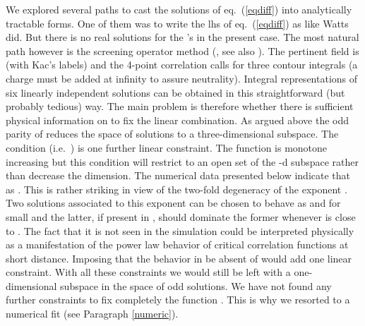 \documentclass[a4paper,12pt]{article}
\begin{document}
We explored several
paths to cast the solutions of eq.\ (\ref{eqdiff}) into analytically tractable forms.
One of them was to write the lhs of eq.\ (\ref{eqdiff}) as 
\coordHE{} like Watts did.
But there is no real solutions for the \coordHE{}'s in the present case. The most
natural path however is the screening operator method (\cite{DF}, see also
\cite{dFMS}). The pertinent field is \coordHE{} (with Kac's labels)
and the 4-point correlation calls for three contour integrals
(a charge \coordHE{} must be added at infinity to assure
neutrality). Integral representations of six linearly independent
solutions can be obtained in this straightforward (but probably tedious)
way. The main problem is therefore whether there is sufficient physical
information on \coordHE{} to fix the linear combination. As argued above the odd parity
of \coordHE{} reduces the space of solutions to a three-dimensional subspace.
The condition \coordHE{} (i.e.\ \coordHE{}) is one
further linear constraint. The function \coordHE{} is monotone increasing
but this condition will restrict \coordHE{} to an open set of the \coordHE{}-d
subspace rather than decrease the dimension. The numerical data presented below indicate that 
\coordHE{} as \coordHE{}.
This is rather striking in view of the two-fold degeneracy of the
exponent \coordHE{}. Two solutions associated to this exponent can
be chosen to behave as \coordHE{} and \coordHE{} for small
\coordHE{} and the latter, if present in \coordHE{}, should dominate the former
whenever \coordHE{} is close to \coordHE{}. 
The fact that it is not seen in the simulation
could be interpreted physically as a manifestation of the power
law behavior of critical correlation functions at short distance. Imposing that
the behavior in \coordHE{} be absent of \coordHE{} would add one linear
constraint. With all these constraints we would still be left with
a one-dimensional subspace in the space of odd solutions. We have not
found any further constraints to fix completely the function \coordHE{}. This
is why we resorted to a numerical fit (see Paragraph \ref{numeric}).
\end{document}
